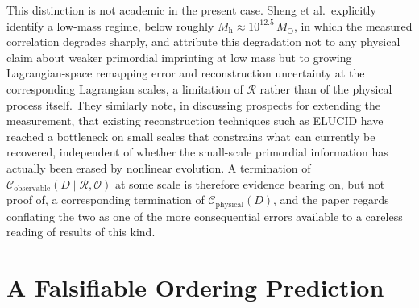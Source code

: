 \documentclass[11pt]{article}
\begin{document}
This distinction is not academic in the present case. Sheng et al.\ explicitly identify a low-mass regime, below roughly $M_{\mathrm h} \approx 10^{12.5}\,M_\odot$, in which the measured correlation degrades sharply, and attribute this degradation not to any physical claim about weaker primordial imprinting at low mass but to growing Lagrangian-space remapping error and reconstruction uncertainty at the corresponding Lagrangian scales, a limitation of $\mathcal R$ rather than of the physical process itself. They similarly note, in discussing prospects for extending the measurement, that existing reconstruction techniques such as ELUCID have reached a bottleneck on small scales that constrains what can currently be recovered, independent of whether the small-scale primordial information has actually been erased by nonlinear evolution. A termination of $\mathcal C_{\mathrm{observable}}(D \mid \mathcal R, \mathcal O)$ at some scale is therefore evidence bearing on, but not proof of, a corresponding termination of $\mathcal C_{\mathrm{physical}}(D)$, and the paper regards conflating the two as one of the more consequential errors available to a careless reading of results of this kind.

\section{A Falsifiable Ordering Prediction}
\end{document}
